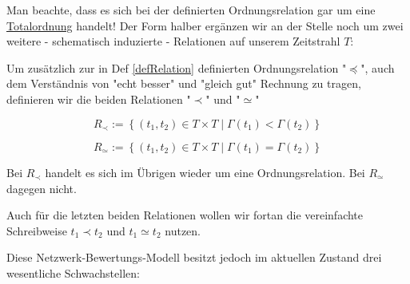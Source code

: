 \documentclass[11pt]{scrartcl}
\begin{document}
\vspace{1cm}

Man beachte, dass es sich bei der definierten Ordnungsrelation gar um eine \href{https://de.wikipedia.org/wiki/Ordnungsrelation#Totalordnung}{Totalordnung} handelt!
Der Form halber ergänzen wir an der Stelle noch um zwei weitere - schematisch induzierte - Relationen auf unserem Zeitstrahl $T$:

\vspace{0.3cm}

\begin{Def}\label{defRelationen}

Um zusätzlich zur in Def \ref{defRelation} definierten Ordnungsrelation "$\preceq$", auch dem Verständnis von "echt besser" und "gleich gut" Rechnung zu tragen, definieren wir die beiden Relationen "$\prec$" und "$\simeq$"

\vspace{0.3cm}

\begin{equation*}
  R_{\prec}:= \left\{ (t_1, t_2) \in T \times T \mid \Gamma(t_1) < \Gamma(t_2) \right\}
\end{equation*}

\begin{equation*}
  R_{\simeq}:= \left\{ (t_1, t_2) \in T \times T \mid \Gamma(t_1) = \Gamma(t_2) \right\}
\end{equation*}

\vspace{1cm}

Bei $R_{\prec}$ handelt es sich im Übrigen wieder um eine Ordnungsrelation. Bei $R_{\simeq}$ dagegen nicht.

\end{Def}

\vspace{0.3cm}

Auch für die letzten beiden Relationen wollen wir fortan die vereinfachte Schreibweise $t_1 \prec t_2$ und $t_1 \simeq t_2$ nutzen. 

\vspace{1cm}

Diese Netzwerk-Bewertungs-Modell besitzt jedoch im aktuellen Zustand drei wesentliche Schwachstellen:
\end{document}
